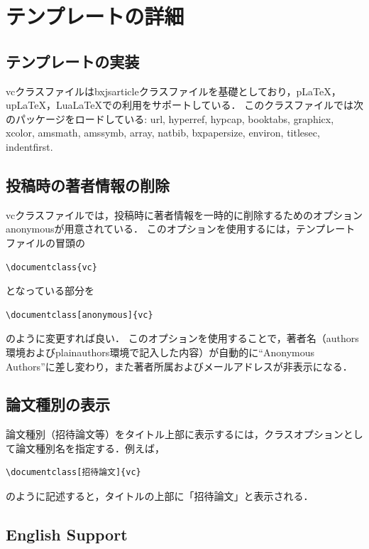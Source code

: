\documentclass[anonymous]{vc}
\begin{document}
\section{テンプレートの詳細}

\subsection{テンプレートの実装}

\textsf{vc}クラスファイルは\textsf{bxjsarticle}クラスファイルを基礎としており，pLaTeX，upLaTeX，LuaLaTeXでの利用をサポートしている．
このクラスファイルでは次のパッケージをロードしている:
\textsf{url},
\textsf{hyperref},
\textsf{hypcap},
\textsf{booktabs},
\textsf{graphicx},
\textsf{xcolor},
\textsf{amsmath},
\textsf{amssymb},
\textsf{array},
\textsf{natbib},
\textsf{bxpapersize},
\textsf{environ},
\textsf{titlesec},
\textsf{indentfirst}.

\subsection{投稿時の著者情報の削除}

\textsf{vc}クラスファイルでは，投稿時に著者情報を一時的に削除するためのオプション\textsf{anonymous}が用意されている．
このオプションを使用するには，テンプレートファイルの冒頭の
\begin{verbatim}
\documentclass{vc}
\end{verbatim}
となっている部分を
\begin{verbatim}
\documentclass[anonymous]{vc}
\end{verbatim}
のように変更すれば良い．
このオプションを使用することで，著者名（\textsf{authors}環境および\textsf{plainauthors}環境で記入した内容）が自動的に``Anonymous Authors''に差し変わり，また著者所属およびメールアドレスが非表示になる．

\subsection{論文種別の表示}

論文種別（招待論文等）をタイトル上部に表示するには，クラスオプションとして論文種別名を指定する．例えば，
\begin{verbatim}
\documentclass[招待論文]{vc}
\end{verbatim}
のように記述すると，タイトルの上部に「招待論文」と表示される．

\subsection{English Support}
\end{document}

